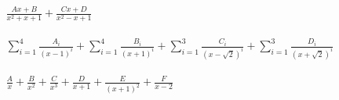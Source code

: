 \documentclass[11pt]{amsbook}
\begin{document}

\begin{hEnumerateAlpha}
\setcounter{enumi}{4}
\item $\begin{aligned}\frac{Ax+B}{x^{2}+x+1} + \frac{Cx+D}{x^{2}-x+1}\end{aligned}$
\item $\begin{aligned}\sum_{i=1}^4 \frac{A_{i}}{(x-1)^{i}} + \sum_{i=1}^4 \frac{B_{i}}{(x+1)^{i}} + \sum_{i=1}^3 \frac{C_{i}}{(x-\sqrt{2})^{i}} + \sum_{i=1}^3 \frac{D_{i}}{(x+\sqrt{2})^{i}}\end{aligned}$
\item $\begin{aligned}\frac{A}{x} + \frac{B}{x^{2}} + \frac{C}{x^{3}} + \frac{D}{x+1} + \frac{E}{(x+1)^{2}} + \frac{F}{x-2}\end{aligned}$
\end{hEnumerateAlpha}
\end{document}
